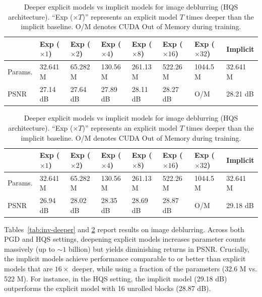 \documentclass{amsart} %
\theoremstyle{definition}
\theoremstyle{remark}
\begin{document}
\begin{table}[t]
\small
\centering
\caption{Deeper explicit models vs implicit models for image deblurring (PGD architecture). ``Exp ($\times T$)'' represents an explicit model $T$ times deeper than the implicit baseline. O/M denotes CUDA Out of Memory during training. }
\label{tab:inv-deeper}
\begin{tabular}{l|l|l|l|l|l|l|l}
\hline
& Exp ($\times 1$) & Exp ($\times 2$) & Exp ($\times 4$) & Exp ($\times 8$) & Exp ($\times 16$) & Exp ($\times 32$) &  Implicit        \\ \hline\hline
 Params.        & 32.641 M             & 65.282 M             & 130.56 M             & 261.13 M  & 522.26 M             & 1044.5 M            & 32.641 M    \\ \hline    
 PSNR    & 27.14 dB     & 27.64 dB    & 27.89 dB & 28.11 dB     & 28.27 dB    & O/M      & 28.21 dB \\ \hline
\end{tabular}

\vspace{5mm}

\caption{Deeper explicit models vs implicit models for image deblurring (HQS architecture). ``Exp ($\times T$)'' represents an explicit model $T$ times deeper than the implicit baseline. O/M denotes CUDA Out of Memory during training. }
\label{tab:inv-wider}
\begin{tabular}{l|l|l|l|l|l|l|l}
\hline
 & Exp ($\times 1$) & Exp ($\times 2$) & Exp ($\times 4$) & Exp ($\times 8$) & Exp ($\times 16$) & Exp ($\times 32$) &  Implicit        \\ \hline\hline
 Params.        & 32.641 M             & 65.282 M             & 130.56 M             & 261.13 M  & 522.26 M             & 1044.5 M            & 32.641 M        \\ \hline
 PSNR     & 26.94 dB    & 28.02  dB   & 28.35 dB & 28.69 dB & 28.87 dB & O/M   & 29.18 dB\\ \hline
\end{tabular}
\end{table}

Tables~\ref{tab:inv-deeper} and \ref{tab:inv-wider} report results on image deblurring. Across both PGD and HQS settings, deepening explicit models increases parameter counts massively (up to $\sim 1$ billion) but yields diminishing returns in PSNR. Crucially, the implicit models achieve performance comparable to or better than explicit models that are $16\times$ deeper, while using a fraction of the parameters (32.6 M vs. 522 M). For instance, in the HQS setting, the implicit model (29.18 dB) outperforms the explicit model with 16 unrolled blocks (28.87 dB). 
 
\end{document}
